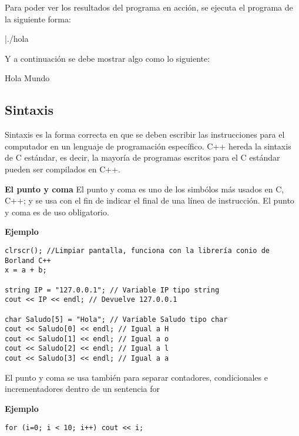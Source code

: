 Para poder ver los resultados del programa en acción, se ejecuta el programa de la siguiente forma:

\begin{listing}[style=consola, numbers=none,label=ejecutar,caption=Ejecutar]
|./hola
\end{listing}

Y a continuación se debe mostrar algo como lo siguiente:

\begin{listing}[style=consola, numbers=none,label=resultado,caption=Resultado]
Hola Mundo
\end{listing}


\subsection{Sintaxis}

Sintaxis es la forma correcta en que se deben escribir las instrucciones para el computador en un lenguaje de programación específico. C++ hereda la sintaxis de C estándar, es decir, la mayoría de programas escritos para el C estándar pueden ser compilados en C++.

\textbf{El punto y coma}
El punto y coma es uno de los simbólos más usados en C, C++; y se usa con el fin de indicar el final de una línea de instrucción. El punto y coma es de uso obligatorio.

\textbf{Ejemplo}

\begin{lstlisting}[style=Cpp, label=sintaxis, caption=Sintaxis]
clrscr(); //Limpiar pantalla, funciona con la librería conio de Borland C++
x = a + b;
 
string IP = "127.0.0.1"; // Variable IP tipo string
cout << IP << endl; // Devuelve 127.0.0.1
 
char Saludo[5] = "Hola"; // Variable Saludo tipo char
cout << Saludo[0] << endl; // Igual a H
cout << Saludo[1] << endl; // Igual a o
cout << Saludo[2] << endl; // Igual a l
cout << Saludo[3] << endl; // Igual a a
\end{lstlisting}

El punto y coma se usa también para separar contadores, condicionales e incrementadores dentro de un sentencia for

\textbf{Ejemplo}

\begin{lstlisting}[style=Cpp, label=sintaxis, caption=Sintaxis]
for (i=0; i < 10; i++) cout << i;
\end{lstlisting}

